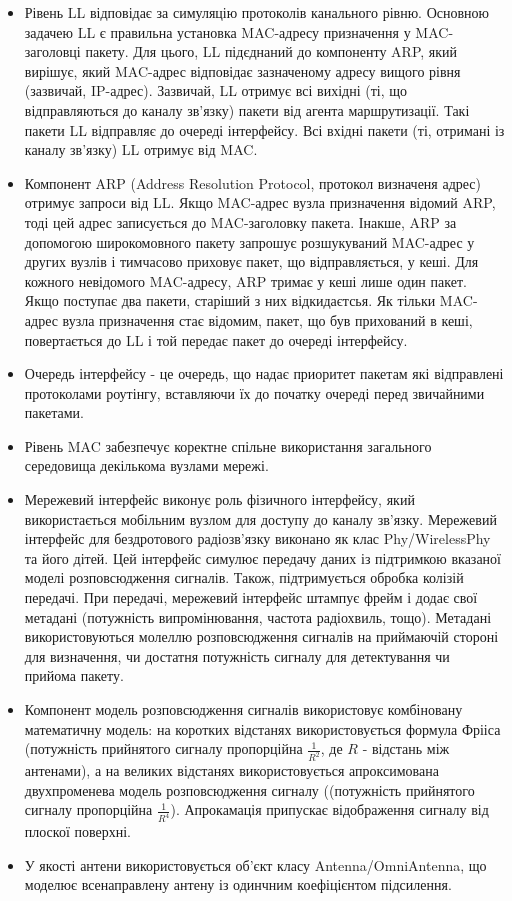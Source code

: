 \documentclass[a4paper,ukrainian,utf8,nocolumnsxix,floatsection]{eskdtext}
\begin{document}
\begin{itemize}
	\item Рівень LL відповідає за симуляцію протоколів канального рівню. Основною задачею LL є правильна установка MAC-адресу призначення у MAC-заголовці пакету. Для цього, LL підєднаний до компоненту ARP, який вирішує, який MAC-адрес відповідає зазначеному адресу вищого рівня (зазвичай, IP-адрес). Зазвичай, LL отримує всі вихідні (ті, що відправляються до каналу зв’язку) пакети від агента маршрутизації. Такі пакети LL відправляє до очереді інтерфейсу. Всі вхідні пакети (ті, отримані із каналу зв’язку) LL отримує від MAC.

	\item Компонент ARP (Address Resolution Protocol, протокол визначеня адрес) отримує запроси від LL. Якщо MAC-адрес вузла призначення відомий ARP, тоді цей адрес записується до MAC-заголовку пакета. Інакше, ARP за допомогою широкомовного пакету запрошує розшукуваний MAC-адрес у других вузлів і тимчасово приховує пакет, що відправляється, у кеші. Для кожного невідомого MAC-адресу, ARP тримає у кеші лише один пакет. Якщо поступає два пакети, старіший з них відкидаєтсья. Як тільки MAC-адрес вузла призначення стає відомим, пакет, що був прихований в кеші, повертається до LL і той передає пакет до очереді інтерфейсу.

	\item Очередь інтерфейсу - це очередь, що надає приоритет пакетам які відправлені протоколами роутінгу, вставляючи їх до початку очереді перед звичайними пакетами.

	\item Рівень MAC забезпечує коректне спільне використання загального середовища декількома вузлами мережі. 

	\item Мережевий інтерфейс виконує роль фізичного інтерфейсу, який використається мобільним вузлом для доступу до каналу зв’язку. Мережевий інтерфейс для бездротового радіозв’язку виконано як клас Phy/WirelessPhy та його дітей. Цей інтерфейс симулює передачу даних із підтримкою вказаної моделі розповсюдження сигналів. Також, підтримується обробка колізій передачі. При передачі, мережевий інтерфейс штампує фрейм і додає свої метадані (потужність випромінювання, частота радіохвиль, тощо). Метадані використовуються молеллю розповсюдження сигналів на приймаючій стороні для визначення, чи достатня потужність сигналу для детектування чи прийома пакету.

	\item Компонент модель розповсюдження сигналів використовує комбіновану математичну модель: на коротких відстанях використовується формула Фрііса (потужність прийнятого сигналу пропорційна $\frac{1}{R^2}$, де $R$ - відстань між антенами), а на великих відстанях використовується апроксимована двухпроменева модель розповсюдження сигналу ((потужність прийнятого сигналу пропорційна $\frac{1}{R^4}$). Апрокамація припускає відображення сигналу від плоскої поверхні. 

	\item У якості антени використовується об’єкт класу Antenna/OmniAntenna, що моделює всенаправлену антену із одинчним коефіцієнтом підсилення. 
\end{itemize}
\end{document}
